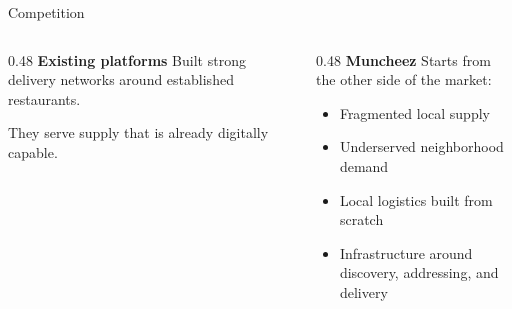 \documentclass[aspectratio=169]{beamer}
\newcommand{\sectiontitle}[1]{\textbf{\large #1}}
\begin{document}
\begin{frame}{Competition}
  \begin{columns}[T]
    \begin{column}{0.48\textwidth}
      \sectiontitle{Existing platforms}
      \vspace{3mm}
      Built strong delivery networks around established restaurants.
      
      \vspace{4mm}
      They serve supply that is already digitally capable.
    \end{column}
    \begin{column}{0.48\textwidth}
      \sectiontitle{Muncheez}
      \vspace{3mm}
      Starts from the other side of the market:
      
      \vspace{3mm}
      \begin{itemize}
        \item Fragmented local supply
        \item Underserved neighborhood demand
        \item Local logistics built from scratch
        \item Infrastructure around discovery, addressing, and delivery
      \end{itemize}
    \end{column}
  \end{columns}
  
  \vspace{6mm}
  \centering
\end{frame}
\end{document}
